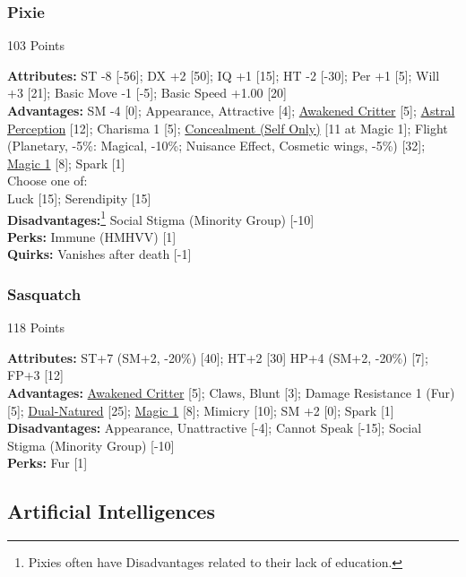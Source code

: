\begin{multicols*}{3}
	\subsubsection*{Pixie}
	\begin{flushright}
		103 Points
	\end{flushright}
	\textbf{Attributes:} 
	ST -8 [-56]; DX +2 [50]; IQ +1 [15]; HT -2 [-30]; Per +1 [5]; Will +3 [21]; Basic Move -1 [-5]; Basic Speed +1.00 [20]
	\\\textbf{Advantages:} 
	SM -4 [0]; Appearance, Attractive [4]; \hyperref[awakened_critter]{Awakened Critter} [5]; \hyperref[astral_perception]{Astral Perception} [12]; Charisma 1 [5]; \hyperref[concealment_self_only]{Concealment (Self Only)} [11 at Magic 1]; Flight (Planetary, -5\%: Magical, -10\%; Nuisance Effect,  Cosmetic wings, -5\%) [32]; \hyperref[magic]{Magic 1} [8]; Spark [1]
	\\ Choose one of: \\
	Luck [15]; Serendipity [15]
	\\\textbf{Disadvantages:}\footnote{Pixies often have Disadvantages related to their lack of education.}
	Social Stigma (Minority Group) [-10]
	\\\textbf{Perks:}
	Immune (HMHVV) [1]
	\\\textbf{Quirks:}
	Vanishes after death [-1]
	
	\subsubsection*{Sasquatch}
	\begin{flushright}
		118 Points
	\end{flushright}
	\textbf{Attributes:} 
	ST+7 (SM+2, -20\%) [40]; HT+2 [30] HP+4 (SM+2, -20\%) [7]; FP+3 [12]
	\\\textbf{Advantages:} 
	\hyperref[awakened_critter]{Awakened Critter} [5]; Claws, Blunt [3]; Damage Resistance 1 (Fur) [5];  \hyperref[dual_natured]{Dual-Natured} [25]; \hyperref[magic]{Magic 1} [8]; Mimicry [10]; SM +2 [0]; Spark [1]
	\\\textbf{Disadvantages:} 
	Appearance, Unattractive [-4]; Cannot Speak [-15]; Social Stigma (Minority Group) [-10]
	\\\textbf{Perks:}
	Fur [1]
	
	\subsection{Artificial Intelligences}
	

\end{multicols*}

